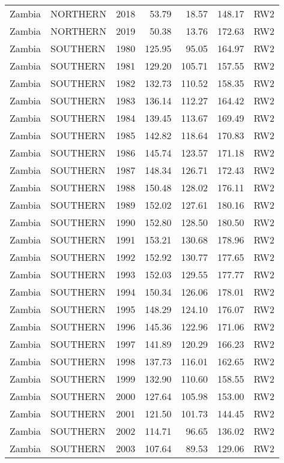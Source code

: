 \begin{longtable}{lllrrrl}
  Zambia & NORTHERN & 2018 & 53.79 & 18.57 & 148.17 & RW2 \\ 
  Zambia & NORTHERN & 2019 & 50.38 & 13.76 & 172.63 & RW2 \\ 
  Zambia & SOUTHERN & 1980 & 125.95 & 95.05 & 164.97 & RW2 \\ 
  Zambia & SOUTHERN & 1981 & 129.20 & 105.71 & 157.55 & RW2 \\ 
  Zambia & SOUTHERN & 1982 & 132.73 & 110.52 & 158.35 & RW2 \\ 
  Zambia & SOUTHERN & 1983 & 136.14 & 112.27 & 164.42 & RW2 \\ 
  Zambia & SOUTHERN & 1984 & 139.45 & 113.67 & 169.49 & RW2 \\ 
  Zambia & SOUTHERN & 1985 & 142.82 & 118.64 & 170.83 & RW2 \\ 
  Zambia & SOUTHERN & 1986 & 145.74 & 123.57 & 171.18 & RW2 \\ 
  Zambia & SOUTHERN & 1987 & 148.34 & 126.71 & 172.43 & RW2 \\ 
  Zambia & SOUTHERN & 1988 & 150.48 & 128.02 & 176.11 & RW2 \\ 
  Zambia & SOUTHERN & 1989 & 152.02 & 127.61 & 180.16 & RW2 \\ 
  Zambia & SOUTHERN & 1990 & 152.80 & 128.50 & 180.50 & RW2 \\ 
  Zambia & SOUTHERN & 1991 & 153.21 & 130.68 & 178.96 & RW2 \\ 
  Zambia & SOUTHERN & 1992 & 152.92 & 130.77 & 177.65 & RW2 \\ 
  Zambia & SOUTHERN & 1993 & 152.03 & 129.55 & 177.77 & RW2 \\ 
  Zambia & SOUTHERN & 1994 & 150.34 & 126.06 & 178.01 & RW2 \\ 
  Zambia & SOUTHERN & 1995 & 148.29 & 124.10 & 176.07 & RW2 \\ 
  Zambia & SOUTHERN & 1996 & 145.36 & 122.96 & 171.06 & RW2 \\ 
  Zambia & SOUTHERN & 1997 & 141.89 & 120.29 & 166.23 & RW2 \\ 
  Zambia & SOUTHERN & 1998 & 137.73 & 116.01 & 162.65 & RW2 \\ 
  Zambia & SOUTHERN & 1999 & 132.90 & 110.60 & 158.55 & RW2 \\ 
  Zambia & SOUTHERN & 2000 & 127.64 & 105.98 & 153.00 & RW2 \\ 
  Zambia & SOUTHERN & 2001 & 121.50 & 101.73 & 144.45 & RW2 \\ 
  Zambia & SOUTHERN & 2002 & 114.71 & 96.65 & 136.02 & RW2 \\ 
  Zambia & SOUTHERN & 2003 & 107.64 & 89.53 & 129.06 & RW2 \\ 

\end{longtable}
